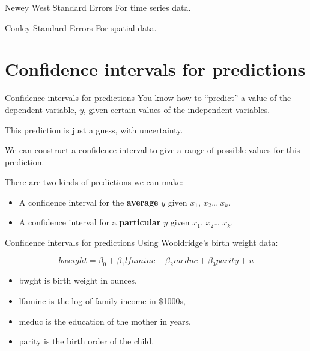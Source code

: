 \documentclass[
  ignorenonframetext,
]{beamer}
\begin{document}
\begin{frame}{Newey West Standard Errors}
\protect\hypertarget{newey-west-standard-errors}{}
For time series data.
\end{frame}

\begin{frame}{Conley Standard Errors}
\protect\hypertarget{conley-standard-errors}{}
For spatial data.
\end{frame}

\hypertarget{confidence-intervals-for-predictions}{%
\section{Confidence intervals for
predictions}\label{confidence-intervals-for-predictions}}

\begin{frame}{Confidence intervals for predictions}
\protect\hypertarget{confidence-intervals-for-predictions-1}{}
You know how to ``predict'' a value of the dependent variable, \(y\),
given certain values of the independent variables.

This prediction is just a guess, with uncertainty.

We can construct a confidence interval to give a range of possible
values for this prediction.

There are two kinds of predictions we can make:

\begin{itemize}
\item
  A confidence interval for the \textbf{average} \(y\) given \(x_1\),
  \(x_2\)\ldots{} \(x_k\).
\item
  A confidence interval for a \textbf{particular} \(y\) given \(x_1\),
  \(x_2\)\ldots{} \(x_k\).
\end{itemize}
\end{frame}

\begin{frame}{Confidence intervals for predictions}
\protect\hypertarget{confidence-intervals-for-predictions-2}{}
Using Wooldridge's birth weight data:

\[
bweight=\beta_0+\beta_1lfaminc+\beta_2 meduc+\beta_3 parity+u
\]

\begin{itemize}
\item
  bwght is birth weight in ounces,
\item
  lfaminc is the log of family income in \$1000s,
\item
  meduc is the education of the mother in years,
\item
  parity is the birth order of the child.
\end{itemize}
\end{frame}
\end{document}
